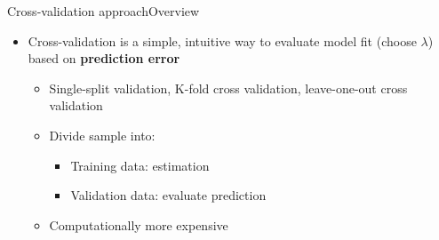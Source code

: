 \documentclass[hyperref={pdfpagelabels=false}]{beamer}
\begin{document}





\date
{}


\begin{frame}{}
	\titlepage
\end{frame}





\begin{frame}{Cross-validation approach}{Overview}
	\begin{itemize}
		\item Cross-validation is a simple, intuitive way to evaluate model fit (choose $\lambda$) based on \textbf{prediction
		error}
					\vspace{0.2cm}
			\begin{itemize}
				\item Single-split validation, K-fold cross validation, leave-one-out cross validation
				\vspace{0.2cm}
				\item Divide sample into:
								\vspace{0.2cm}
				 			\begin{itemize}
				\item Training data: estimation
								\vspace{0.2cm}
				\item Validation data: evaluate prediction
								\vspace{0.2cm}
							\end{itemize}		
				\item Computationally more expensive 
			\end{itemize}		
					
	
		
	\end{itemize}
\end{frame}
\end{document}
